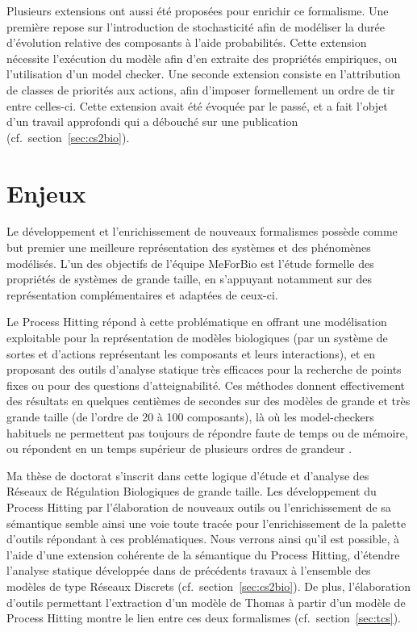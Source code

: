 Plusieurs extensions ont aussi été proposées pour enrichir ce formalisme.
Une première repose sur l'introduction de stochasticité afin de modéliser la durée d'évolution relative des composants à l'aide probabilités.
Cette extension nécessite l'exécution du modèle afin d'en extraite des propriétés empiriques, ou l'utilisation d'un model checker.
Une seconde extension consiste en l'attribution de classes de priorités aux actions, afin d'imposer formellement un ordre de tir entre celles-ci.
Cette extension avait été évoquée par le passé, et a fait l'objet d'un travail approfondi qui a débouché sur une publication (cf.~section~\ref{sec:cs2bio}).



\section{Enjeux}

Le développement et l'enrichissement de nouveaux formalismes possède comme but premier une meilleure représentation des systèmes et des phénomènes modélisés.
L'un des objectifs de l'équipe MeForBio est l'étude formelle des propriétés de systèmes de grande taille,
en s'appuyant notamment sur des représentation complémentaires et adaptées de ceux-ci.

Le Process Hitting répond à cette problématique en offrant une modélisation exploitable pour la représentation de modèles biologiques (par un système de sortes et d'actions représentant les composants et leurs interactions),
et en proposant des outils d'analyse statique très efficaces pour la recherche de points fixes ou pour des questions d'atteignabilité.
Ces méthodes donnent effectivement des résultats en quelques centièmes de secondes sur des modèles de grande et très grande taille (de l'ordre de 20 à 100 composants), là où les model-checkers habituels ne permettent pas toujours de répondre faute de temps ou de mémoire, ou répondent en un temps supérieur de plusieurs ordres de grandeur \cite{PMR12-MSCS}.

Ma thèse de doctorat s'inscrit dans cette logique d'étude et d'analyse des Réseaux de Régulation Biologiques de grande taille.
Les développement du Process Hitting par l'élaboration de nouveaux outils ou l'enrichissement de sa sémantique semble ainsi une voie toute tracée pour l'enrichissement de la palette d'outils répondant à ces problématiques.
Nous verrons ainsi qu'il est possible, à l'aide d'une extension cohérente de la sémantique du Process Hitting, d'étendre l'analyse statique développée dans de précédents travaux à l'ensemble des modèles de type Réseaux Discrets (cf.~section~\ref{sec:cs2bio}).
De plus, l'élaboration d'outils permettant l'extraction d'un modèle de Thomas à partir d'un modèle de Process Hitting montre le lien entre ces deux formalismes (cf.~section~\ref{sec:tcs}).

